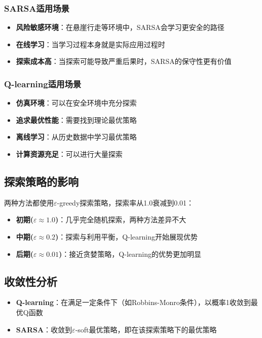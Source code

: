 \documentclass[12pt,a4paper]{article}
\begin{document}
\subsubsection{SARSA适用场景}

\begin{itemize}
    \item \textbf{风险敏感环境}：在悬崖行走等环境中，SARSA会学习更安全的路径
    \item \textbf{在线学习}：当学习过程本身就是实际应用过程时
    \item \textbf{探索成本高}：当探索可能导致严重后果时，SARSA的保守性更有价值
\end{itemize}

\subsubsection{Q-learning适用场景}

\begin{itemize}
    \item \textbf{仿真环境}：可以在安全环境中充分探索
    \item \textbf{追求最优性能}：需要找到理论最优策略
    \item \textbf{离线学习}：从历史数据中学习最优策略
    \item \textbf{计算资源充足}：可以进行大量探索
\end{itemize}

\subsection{探索策略的影响}

两种方法都使用$\varepsilon$-greedy探索策略，探索率从1.0衰减到0.01：

\begin{itemize}
    \item \textbf{初期($\varepsilon \approx 1.0$)}：几乎完全随机探索，两种方法差异不大
    \item \textbf{中期($\varepsilon \approx 0.2$)}：探索与利用平衡，Q-learning开始展现优势
    \item \textbf{后期($\varepsilon \approx 0.01$)}：接近贪婪策略，Q-learning的优势更加明显
\end{itemize}

\subsection{收敛性分析}

\begin{itemize}
    \item \textbf{Q-learning}：在满足一定条件下（如Robbins-Monro条件），以概率1收敛到最优Q函数
    \item \textbf{SARSA}：收敛到$\varepsilon$-soft最优策略，即在该探索策略下的最优策略
\end{itemize}
\end{document}
